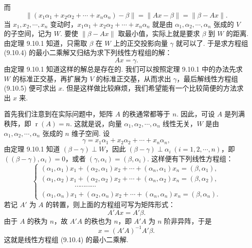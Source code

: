 \documentclass[UTF8, 12pt, fontset=fandol, oneside]{ctexart}
\begin{document}
而
\[
  \|(x_1\alpha_1+x_2\alpha_2+\cdots+x_n\alpha_n)-\beta\|
  =\|Ax-\beta\|=\|\beta-Ax\|.
\]
当 $x_1,x_2,\cdots,x_n$ 变动时，$x_1\alpha_1+x_2\alpha_2+\cdots+x_n\alpha_n$ 就是由 $\alpha_1,\alpha_2,\cdots,\alpha_n$ 张成的 $V$ 的子空间，记为 $W$. 要使 $\|\beta-Ax\|$ 取最小值，实际上就是要求 $\beta$ 到 $W$ 的距离. 由定理 9.10.1 知道，只需取 $\beta$ 在 $W$ 上的正交投影向量 $\gamma$ 就可以了. 于是求方程组 (9.10.4) 的最小二乘解又归结为求下列线性方程组的解：
\begin{equation}
  Ax=\gamma.
  \tag{9.10.5}
\end{equation}
由定理 9.10.1 知道这样的解总是存在的. 我们可以按照定理 9.10.1 中的办法先求 $W$ 的标准正交基，再扩展为 $V$ 的标准正交基，从而求出 $\gamma$，最后解线性方程组 (9.10.5) 便可求出 $x$. 但是这样做比较麻烦，我们希望能有一个比较简便的方法求出 $x$ 来.

首先我们注意到在实际问题中，矩阵 $A$ 的秩通常都等于 $n$. 因此，可设 $A$ 是列满秩阵，即 $\operatorname{r}(A)=n$. 这就是说，向量 $\alpha_1,\alpha_2,\cdots,\alpha_n$ 线性无关，$W$ 是由 $\alpha_1,\alpha_2,\cdots,\alpha_n$ 张成的 $n$ 维子空间. 设
\begin{equation}
  \gamma=x_1\alpha_1+x_2\alpha_2+\cdots+x_n\alpha_n,
  \tag{9.10.6}
\end{equation}
由定理 9.10.1 知道 $(\beta-\gamma)\perp W$，因此 $(\beta-\gamma)\perp\alpha_i\ (i=1,2,\cdots,n)$，即 $((\beta-\gamma),\alpha_i)=0$，或者 $(\gamma,\alpha_i)=(\beta,\alpha_i)$. 这样便有下列线性方程组：
\[
  \begin{cases}
    (\alpha_1,\alpha_1)x_1+(\alpha_2,\alpha_1)x_2+\cdots+(\alpha_n,\alpha_1)x_n=(\beta,\alpha_1),\\
    (\alpha_1,\alpha_2)x_1+(\alpha_2,\alpha_2)x_2+\cdots+(\alpha_n,\alpha_2)x_n=(\beta,\alpha_2),\\
    \hspace{5em}\cdots\cdots\cdots\cdots\\
    (\alpha_1,\alpha_n)x_1+(\alpha_2,\alpha_n)x_2+\cdots+(\alpha_n,\alpha_n)x_n=(\beta,\alpha_n).
  \end{cases}
\]
若记 $A'$ 为 $A$ 的转置，则上面的方程组可写为矩阵形式：
\[
  A'Ax=A'\beta.
\]
由于 $A$ 的秩为 $n$，故 $A'A$ 的秩也为 $n$，即 $A'A$ 为 $n$ 阶非异阵，于是
\[
  x=(A'A)^{-1}A'\beta.
\]
这就是线性方程组 (9.10.4) 的最小二乘解.
\end{document}
